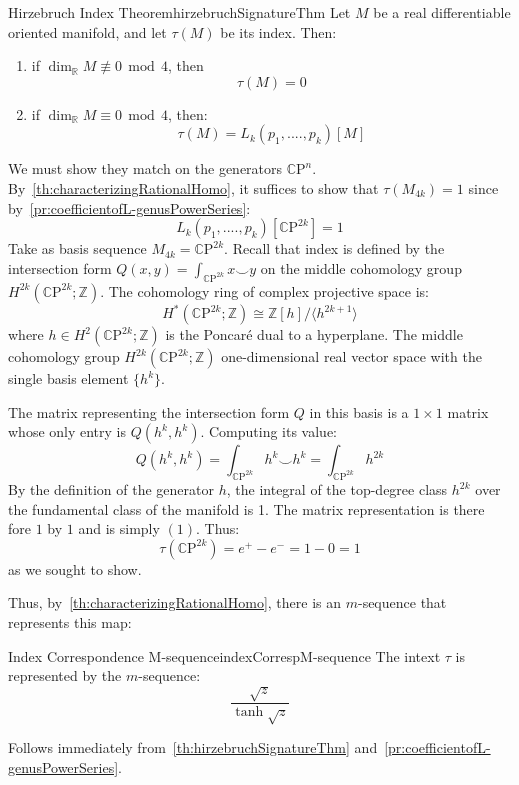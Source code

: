 \documentclass{ut-thesis}
\newenvironment{Proof}[1][]
  {\begin{ProofTcb}[#1]}
  {\end{ProofTcb}}
\newcommand{\R}{{\mathbb{R}}}
\newcommand{\Z}{{\mathbb{Z}}}
\newcommand{\CP}{{\mathbb{C}\mathrm{P}}}
\renewcommand{\mod}{\,\operatorname{mod}\,}
\begin{document}
\begin{thm}{Hirzebruch Index Theorem}{hirzebruchSignatureThm}
  Let $M$ be a real differentiable oriented manifold, and let $\tau(M)$ be its index. Then:
  \begin{enumerate}
    \item if $\dim_\R M\not\equiv 0\mod 4$, then
      \[
        \tau(M) = 0
      \]
    \item if $\dim_\R M\equiv 0\mod 4$, then:
      \[
        \tau(M) = L_k(p_1, ...., p_k)[M]
      \]
  \end{enumerate}
\end{thm}

\begin{Proof}
  We must show they match on the generators $\CP^n$. By~\cref{th:characterizingRationalHomo}, it suffices to
  show that $\tau(M_{4k}) = 1$ since by~\cref{pr:coefficientofL-genusPowerSeries}:
  \[
    L_k(p_1, ...., p_k)[\CP^{2k}] = 1
  \]
  Take as basis sequence $M_{4k}=\CP^{2k}$. Recall that index is defined by the
  intersection form $Q(x,y) = \int_{{\CP}^{2k}} x \smile y$ on the middle cohomology group
  $H^{2k}({\CP}^{2k}; {\Z})$. The cohomology ring of complex projective space is:
  \[
  H^*({\CP}^{2k}; {\Z}) \cong {\Z}[h] / \langle h^{2k+1} \rangle
  \]
  where $h \in H^2({\CP}^{2k}; {\Z})$ is the Poncar\'e dual to a hyperplane. The middle cohomology group $H^{2k}({\CP}^{2k}; {\Z})$ one-dimensional real vector space with the single basis element $\{h^k\}$.

The matrix representing the intersection form $Q$ in this basis is a $1 \times 1$ matrix whose only entry is
$Q(h^k, h^k)$. Computing its value:
\[
Q(h^k, h^k) = \int_{{\CP}^{2k}} h^k \smile h^k = \int_{{\CP}^{2k}} h^{2k}
\]
By the definition of the generator $h$, the integral of the top-degree class $h^{2k}$ over the fundamental
class of the manifold is 1. The matrix representation is there fore $1$ by $1$ and is simply $(1)$. Thus:
\[
  \tau({\CP}^{2k}) = e^+ - e^- = 1 - 0 = 1
  \]
as we sought to show.
\end{Proof}

Thus, by~\cref{th:characterizingRationalHomo}, there is an $m$-sequence that represents this map:
\begin{thm}{Index Correspondence M-sequence}{indexCorrespM-sequence}
  The intext $\tau$ is represented by the $m$-sequence:
  \[
    \frac{\sqrt{z}}{\tanh{\sqrt{z}}}
  \]
\end{thm}

\begin{Proof}
  Follows immediately from~\cref{th:hirzebruchSignatureThm} and~\cref{pr:coefficientofL-genusPowerSeries}.
\end{Proof}
\end{document}
